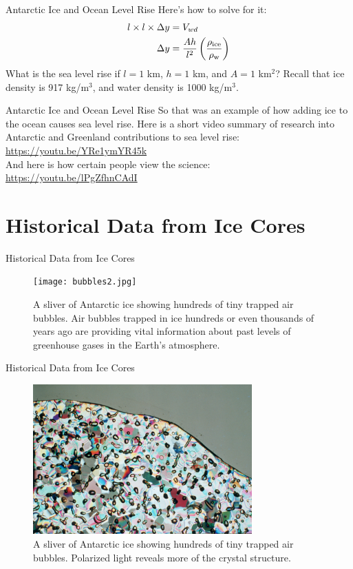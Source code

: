 \documentclass{beamer}
\begin{document}
\begin{frame}{Antarctic Ice and Ocean Level Rise}
Here's how to solve for it:
\begin{align}
l \times l \times \Delta y &= V_{wd} \\
\Delta y &= \frac{Ah}{l^2}\left(\frac{\rho_{\rm ice}}{\rho_{\rm w}}\right)
\end{align}
What is the sea level rise if $l = 1$ km, $h = 1$ km, and $A = 1$ km$^2$?  Recall that ice density is 917 kg/m$^3$, and water density is 1000 kg/m$^3$.
\end{frame}

\begin{frame}{Antarctic Ice and Ocean Level Rise}
So that was an example of how adding ice to the ocean causes sea level rise.  Here is a short video summary of research into Antarctic and Greenland contributions to sea level rise: \\ 
\url{https://youtu.be/YRe1ymYR45k} \\ \vspace{1cm}
And here is how certain people view the science: \\
\url{https://youtu.be/lPgZfhnCAdI}
\end{frame}

\section{Historical Data from Ice Cores}

\begin{frame}{Historical Data from Ice Cores}
\small
\begin{figure}
\centering
\texttt{[image: bubbles2.jpg]}
\caption{\label{fig:bubbles2} A sliver of Antarctic ice showing hundreds of tiny trapped air bubbles.  Air bubbles trapped in ice hundreds or even thousands of years ago are providing vital information about past levels of greenhouse gases in the Earth's atmosphere.}
\end{figure}
\end{frame}

\begin{frame}{Historical Data from Ice Cores}
\small
\begin{figure}
\centering
\includegraphics[width=0.75\textwidth]{bubbles.jpg}
\caption{\label{fig:bubbles} A sliver of Antarctic ice showing hundreds of tiny trapped air bubbles.  Polarized light reveals more of the crystal structure.}
\end{figure}
\end{frame}
\end{document}
